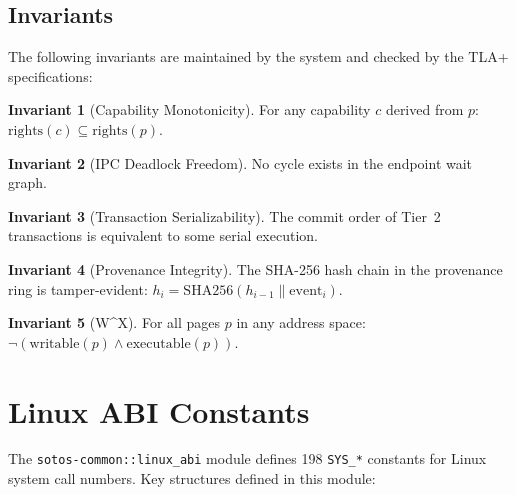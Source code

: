 \documentclass[11pt,a4paper,twoside]{report}
\theoremstyle{definition}
\newtheorem{invariant}{Invariant}[chapter]
\begin{document}
\section{Invariants}

The following invariants are maintained by the system and checked by the
TLA+ specifications:

\begin{invariant}[Capability Monotonicity]
For any capability $c$ derived from $p$:
$\text{rights}(c) \subseteq \text{rights}(p)$.
\end{invariant}

\begin{invariant}[IPC Deadlock Freedom]
No cycle exists in the endpoint wait graph.
\end{invariant}

\begin{invariant}[Transaction Serializability]
The commit order of Tier~2 transactions is equivalent to some serial
execution.
\end{invariant}

\begin{invariant}[Provenance Integrity]
The SHA-256 hash chain in the provenance ring is tamper-evident:
$h_i = \text{SHA256}(h_{i-1} \| \text{event}_i)$.
\end{invariant}

\begin{invariant}[W\^{}X]
For all pages $p$ in any address space:
$\neg(\text{writable}(p) \land \text{executable}(p))$.
\end{invariant}


\appendix

\chapter{Linux ABI Constants}
\label{app:linux-abi}

The \texttt{sotos-common::linux\_abi} module defines 198
\texttt{SYS\_*} constants for Linux system call numbers. Key structures
defined in this module:
\end{document}
